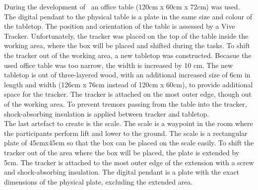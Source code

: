 During the development of \exgo\ an office table (120cm x 60cm x 72cm) was used. The digital pendant to the physical table is a plate in the same size and colour of the tabletop. The position and orientation of the table is assessed by a Vive Tracker. Unfortunately, the tracker was placed on the top of the table inside the working area, where the box will be placed and shifted during the tasks. To shift the tracker out of the working area, a new tabletop was constructed. Becasue the used office table was too narrow, the width is increased by 10 cm. The new tabletop is out of three-layered wood, with an additional increased size of 6cm in length and width (126cm x 76cm instead of 120cm x 60cm), to provide additional space for the tracker. The tracker is attached on the most outer edge, though out of the working area. To prevent tremors passing from the table into the tracker, shock-absorbing insulation is applied between tracker and tabletop.\\
The last artefact to create is the scale. The scale is a waypoint in the room where the participants perform lift and lower to the ground. The scale is a rectangular plate of 45cmx45cm so that the box can be placed on the scale easily. To shift the tracker out of the area where the box will be placed, the plate is extended by 5cm. The tracker is attached to the most outer edge of the extension with a screw and shock-absorbing insulation. The digital pendant is a plate with the exact dimensions of the physical plate, excluding the extended area.\\


